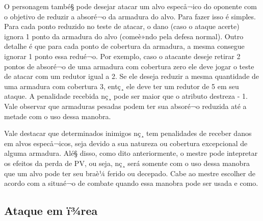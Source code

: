 
O personagem també§ pode desejar atacar um alvo especå¬ico do oponente com o objetivo de reduzir a absoré¬o da armadura do alvo. Para fazer isso é simples. Para cada ponto reduzido no teste de atacar, o dano (caso o ataque acerte) ignora 1 ponto da armadura do alvo (comeè»ndo pela defesa normal). Outro detalhe é que para cada ponto de cobertura da armadura, a mesma consegue ignorar 1 ponto essa redué¬o. Por exemplo, caso o atacante deseje retirar 2 pontos de absoré¬o de uma armadura com cobertura zero ele deve jogar o teste de atacar com um redutor igual a 2. Se ele deseja reduzir a mesma quantidade de uma armadura com cobertura 3, entç¸ ele deve ter um redutor de 5 em seu ataque. A penalidade recebida nç¸ pode ser maior que o atributo destreza - 1. Vale observar que armaduras pesadas podem ter sua absoré¬o reduzida até a metade com o uso dessa manobra.



Vale destacar que determinados inimigos nç¸ tem penalidades de receber danos em alvos especå¬icos, seja devido a sua natureza ou cobertura excepcional de alguma armadura. Alé§ disso, como dito anteriormente, o mestre pode intepretar os efeitos da perda de PV, ou seja, nç¸ será somente com o uso dessa manobra que um alvo pode ter seu braè¼ ferido ou decepado. Cabe ao mestre escolher de acordo com a situaé¬o de combate quando essa manobra pode ser usada e como.

\subsection{Ataque em ï¾rea}

